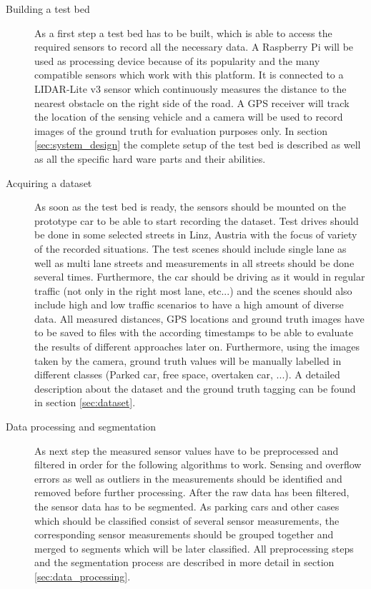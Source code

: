 \begin{description}

\item[Building a test bed] As a first step a test bed has to be built, which is able to access the required sensors to record all the necessary data. A Raspberry Pi will be used as processing device because of its popularity and the many compatible sensors which work with this platform. It is connected to a LIDAR-Lite v3 sensor which continuously measures the distance to the nearest obstacle on the right side of the road. A GPS receiver will track the location of the sensing vehicle and a camera will be used to record images of the ground truth for evaluation purposes only. In section \ref{sec:system_design} the complete setup of the test bed is described as well as all the specific hard ware parts and their abilities.

\item[Acquiring a dataset] As soon as the test bed is ready, the sensors should be mounted on the prototype car to be able to start recording the dataset. Test drives should be done in some selected streets in Linz, Austria with the focus of variety of the recorded situations. The test scenes should include single lane as well as multi lane streets and measurements in all streets should be done several times. Furthermore, the car should be driving as it would in regular traffic (not only in the right most lane, etc...) and the scenes should also include high and low traffic scenarios to have a high amount of diverse data. All measured distances, GPS locations and ground truth images have to be saved to files with the according timestamps to be able to evaluate the results of different approaches later on. Furthermore, using the images taken by the camera, ground truth values will be manually labelled in different classes (Parked car, free space, overtaken car, ...). A detailed description about the dataset and the ground truth tagging can be found in section  \ref{sec:dataset}.

\item[Data processing and segmentation] As next step the measured sensor values have to be preprocessed and filtered in order for the following algorithms to work. Sensing and overflow errors as well as outliers in the measurements should be identified and removed before further processing. After the raw data has been filtered, the sensor data has to be segmented. As parking cars and other cases which should be classified consist of several sensor measurements, the corresponding sensor measurements should be grouped together and merged to segments which will be later classified. All preprocessing steps and the segmentation process are described in more detail in section  \ref{sec:data_processing}.


\end{description}
